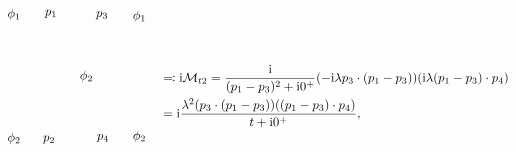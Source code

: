 \begin{equation}
\begin{gathered}
\begin{tikzpicture}[x=0.75pt,y=0.75pt,yscale=-1,xscale=1]
            \draw (185.97,97.34) node [anchor=south east] [inner sep=0.75pt]    {$\phi _{1}$};
            \draw (185.97,213.85) node [anchor=north east] [inner sep=0.75pt]    {$\phi _{2}$};
            \draw (208.98,95.05) node [anchor=south west] [inner sep=0.75pt]    {$p_{1}$};
            \draw (206.98,217.14) node [anchor=north west][inner sep=0.75pt]    {$p_{2}$};
            \draw (245.71,155.59) node [anchor=west] [inner sep=0.75pt]    {$\phi _{2}$};
            \draw (277.99,96.63) node [anchor=south east] [inner sep=0.75pt]    {$p_{3}$};
            \draw (278.99,215.55) node [anchor=north east] [inner sep=0.75pt]    {$p_{4}$};
            \draw (301.45,99.34) node [anchor=south west] [inner sep=0.75pt]    {$\phi _{1}$};
            \draw (301.45,211.85) node [anchor=north west][inner sep=0.75pt]    {$\phi _{2}$};
            \end{tikzpicture}            
    \end{gathered} \quad 
    \begin{aligned}[t]
         &\eqqcolon \ii \mathcal{M}_{t2} = \frac{\ii}{(p_1 - p_3)^2 + \ii 0^+} (- \ii \lambda p_3 \cdot (p_1 - p_3)) ( \ii \lambda (p_1 - p_3) \cdot p_4) \\
         &= \ii \frac{\lambda^2 (p_3 \cdot (p_1 - p_3))((p_1 - p_3) \cdot p_4)}{t + \ii 0^+ },
    \end{aligned}
\end{equation}